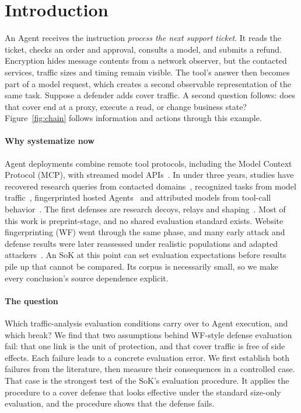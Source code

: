 \section{Introduction}
An Agent receives the instruction \emph{process the next support ticket}. It reads the ticket, checks an order and approval, consults a model, and submits a refund. Encryption hides message contents from a network observer, but the contacted services, traffic sizes and timing remain visible. The tool's answer then becomes part of a model request, which creates a second observable representation of the same task. Suppose a defender adds cover traffic. A second question follows: does that cover end at a proxy, execute a read, or change business state? Figure~\ref{fig:chain} follows information and actions through this example.



\paragraph{Why systematize now}
Agent deployments combine remote tool protocols, including the Model Context Protocol (MCP), with streamed model APIs~\cite{mcp2025transports,rfc9113}. In under three years, studies have recovered research queries from contacted domains~\cite{jeong2026wra}, recognized tasks from model traffic~\cite{li2026ant,pouryousef2026traffic}, fingerprinted hosted Agents~\cite{agentprint2025} and attributed models from tool-call behavior~\cite{zhao2026agenttrace,ediga2026trace}. The first defenses are research decoys, relays and shaping~\cite{jeong2026wra,dangol2026workflow}. Most of this work is preprint-stage, and no shared evaluation standard exists. Website fingerprinting (WF) went through the same phase, and many early attack and defense results were later reassessed under realistic populations and adapted attackers~\cite{dyer2012peekaboo,juarez2014critical,mathews2023critical}. An SoK at this point can set evaluation expectations before results pile up that cannot be compared. Its corpus is necessarily small, so we make every conclusion's source dependence explicit.

\paragraph{The question}
Which traffic-analysis evaluation conditions carry over to Agent execution, and which break? We find that two assumptions behind WF-style defense evaluation fail: that one link is the unit of protection, and that cover traffic is free of side effects. Each failure leads to a concrete evaluation error. We first establish both failures from the literature, then measure their consequences in a controlled case. That case is the strongest test of the SoK's evaluation procedure. It applies the procedure to a cover defense that looks effective under the standard size-only evaluation, and the procedure shows that the defense fails.

